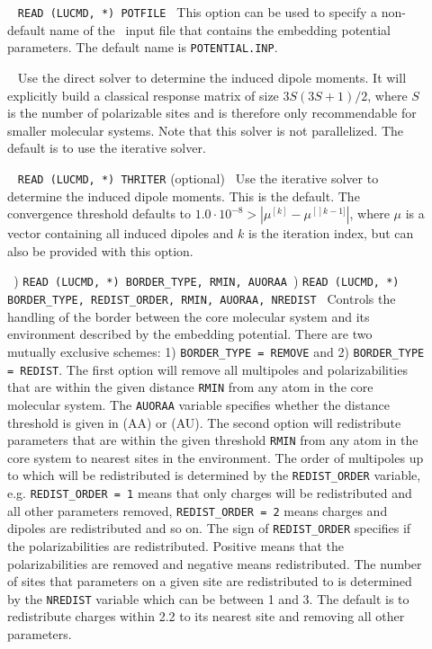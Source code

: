 \begin{description}

\item[]\verb| |\newline
\verb|READ (LUCMD, *) POTFILE|\verb| |\newline
This option can be used to specify a non-default name of the \potinp\ input file that contains the embedding potential parameters. The default name is \verb|POTENTIAL.INP|.

\item[]\verb| |\newline
Use the direct solver to determine the induced dipole moments. It will explicitly build a classical response matrix of size $3S(3S+1)/2$, where $S$ is the number of polarizable sites and is therefore only recommendable for smaller molecular systems. Note that this solver is not parallelized. The default is to use the iterative solver.

\item[]\verb| |\newline
\verb|READ (LUCMD, *) THRITER| (optional)\verb| |\newline
Use the iterative solver to determine the induced dipole moments. This is the default. The convergence threshold defaults to $1.0\cdot10^{-8} > |\mu^{[k]} - \mu^{[]k-1]}|$, where $\mu$ is a vector containing all induced dipoles and $k$ is the iteration index, but can also be provided with this option.

\item[]\verb| |) \verb|READ (LUCMD, *) BORDER_TYPE, RMIN, AUORAA|\verb| |) \verb|READ (LUCMD, *) BORDER_TYPE, REDIST_ORDER, RMIN, AUORAA, NREDIST|\verb| |\newline
Controls the handling of the border between the core molecular system
and its environment described by the embedding potential. There are
two mutually exclusive schemes: 1) \verb|BORDER_TYPE = REMOVE| and 2)
\verb|BORDER_TYPE = REDIST|. The first option will remove all
multipoles and polarizabilities that are within the given distance
\verb|RMIN| from any atom in the core molecular system. The
\verb|AUORAA| variable specifies whether the distance threshold is
given in \angstrom{} (AA) or \bohr{} (AU). The second option will
redistribute parameters that are within the given threshold
\verb|RMIN| from any atom in the core system to nearest sites in the
environment. The order of multipoles up to which will be redistributed
is determined by the \verb|REDIST_ORDER| variable,
e.g. \verb|REDIST_ORDER = 1| means that only charges will be
redistributed and all other parameters removed,
\verb|REDIST_ORDER = 2| means charges and dipoles are redistributed
and so on. The sign of \verb|REDIST_ORDER| specifies if the
polarizabilities are redistributed. Positive means that the
polarizabilities are removed and negative means redistributed. The
number of sites that parameters on a given site are redistributed to
is determined by the \verb|NREDIST| variable which can be between 1
and 3. The default is to redistribute charges within 2.2 \bohr{} to its
nearest site and removing all other parameters.


\end{description}
